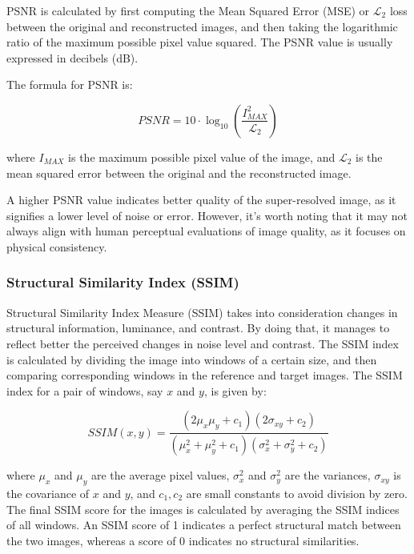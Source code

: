             PSNR is calculated by first computing the Mean Squared Error (MSE) or $\mathcal{L}_2$ loss between the original and reconstructed images, and then taking the logarithmic ratio of the maximum possible pixel value squared. The PSNR value is usually expressed in decibels (dB).
            
            The formula for PSNR is:
            
            \begin{equation}
            PSNR = 10 \cdot \log_{10} \left( \frac{I_{MAX}^{2}}{\mathcal{L}_2} \right)
            \end{equation}
            
            where $I_{MAX}$ is the maximum possible pixel value of the image, and $\mathcal{L}_2$ is the mean squared error between the original and the reconstructed image.
            
            A higher PSNR value indicates better quality of the super-resolved image, as it signifies a lower level of noise or error. However, it's worth noting that it may not always align with human perceptual evaluations of image quality, as it focuses on physical consistency.

        \subsubsection{Structural Similarity Index (SSIM)}

            
        Structural Similarity Index Measure (SSIM) takes into consideration changes in structural information, luminance, and contrast. By doing that, it manages to reflect better the perceived changes in noise level and contrast.
        The SSIM index is calculated by dividing the image into windows of a certain size, and then comparing corresponding windows in the reference and target images. The SSIM index for a pair of windows, say $x$ and $y$, is given by:
        
        \begin{equation}
            SSIM(x, y) = \frac{(2\mu_x\mu_y + c_1)(2\sigma_{xy} + c_2)}{(\mu_x^2 + \mu_y^2 + c_1)(\sigma_x^2 + \sigma_y^2 + c_2)}
        \end{equation}
        
        where $\mu_x$ and $\mu_y$ are the average pixel values, $\sigma_x^2$ and $\sigma_y^2$ are the variances, $\sigma_{xy}$ is the covariance of $x$ and $y$, and $c_1, c_2$ are small constants to avoid division by zero.
        The final SSIM score for the images is calculated by averaging the SSIM indices of all windows. An SSIM score of 1 indicates a perfect structural match between the two images, whereas a score of 0 indicates no structural similarities.

